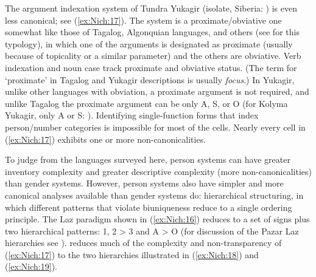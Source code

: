 \documentclass[output=collectionpaper]{langsci/langscibook}
\begin{document}
The argument indexation system of Tundra Yukagir (isolate, Siberia: \citealt{Maslov2003}) is even less canonical; see (\ref{ex:Nich:17}). The system is a proximate/obviative one somewhat like those of Tagalog, Algonquian languages, and others (see \citealt{Bickel2011} for this typology), in which one of the arguments is designated as proximate (usually because of topicality or a similar parameter) and the others are obviative. Verb indexation and noun case track proximate and obviative status. (The term for `proximate' in Tagalog and Yukagir descriptions is usually \textit{focus}.) In Yukagir, unlike other languages with obviation, a proximate argument is not required, and unlike Tagalog the proximate argument can be only A, S, or O (for Kolyma Yukagir, only A or S: \citealt{Maslov2003a}). Identifying single-function forms that index person/number categories is impossible for most of the cells. Nearly every cell in (\ref{ex:Nich:17}) exhibits one or more non-canonicalities.

%

To judge from the languages surveyed here, person systems can have greater inventory complexity and greater descriptive complexity (more non-canonical\-i\-ties) than gender systems. However, person systems also have simpler and more canonical analyses available than gender systems do: hierarchical structuring, in which different patterns that violate biuniqueness reduce to a single ordering principle. The Laz paradigm shown in (\ref{ex:Nich:16}) reduces to a set of signs plus two hierarchical patterns: 1, 2 > 3 and A > O (for discussion of the Pazar Laz hierarchies see \citealt[48]{Oeztuerk2011}). \citet[17, 20]{Maslov2003} reduces much of the complexity and non-transparency of (\ref{ex:Nich:17}) to the two hierarchies illustrated in (\ref{ex:Nich:18}) and (\ref{ex:Nich:19}).
\end{document}
